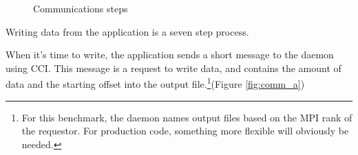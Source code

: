 \begin{figure}[hp]
{{    \label{fig:comm_d}}}    
\centerline{
  \hfil
  } 
\centerline{
  } 
\caption{Communications steps}
\label{fig:communications}
\end{figure}


Writing data from the application is a seven step process.

When it's time to write, the application sends a short message to the daemon using CCI.  This message is a request to write data, and contains the amount of data and the starting offset into the output file.\footnote{For this benchmark, the daemon names output files based on the MPI rank of the requestor.  For production code, something more flexible will obviously be needed.}(Figure \ref{fig:comm_a})

